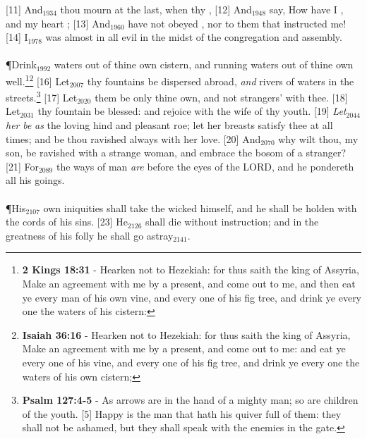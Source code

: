 [11] \textcolor[cmyk]{0.99998,1,0,0}{And\textcolor{jungle}{$_{1934}$} thou mourn at the last, when thy ,}
[12] \textcolor[cmyk]{0.99998,1,0,0}{And\textcolor{jungle}{$_{1948}$} say, How have I , and my heart ;}
[13] \textcolor[cmyk]{0.99998,1,0,0}{And\textcolor{jungle}{$_{1960}$} have not obeyed , nor  to them that instructed me!}
[14] \textcolor[cmyk]{0.99998,1,0,0}{I\textcolor{jungle}{$_{1978}$} was almost in all evil in the midst of the congregation and assembly.}\\
\\
\P \textcolor[cmyk]{0.99998,1,0,0}{Drink\textcolor{jungle}{$_{1992}$} waters out of thine own cistern, and running waters out of thine own well.}\footnote{\textbf{2 Kings 18:31} - Hearken not to Hezekiah: for thus saith the king of Assyria, Make an agreement with me by a present, and come out to me, and then eat ye every man of his own vine, and every one of his fig tree, and drink ye every one the waters of his cistern:}\footnote{\textbf{Isaiah 36:16} - Hearken not to Hezekiah: for thus saith the king of Assyria, Make an agreement with me by a present, and come out to me: and eat ye every one of his vine, and every one of his fig tree, and drink ye every one the waters of his own cistern;}
[16] \textcolor[cmyk]{0.99998,1,0,0}{Let\textcolor{jungle}{$_{2007}$} thy fountains be dispersed abroad, \emph{and} rivers of waters in the streets.}\footnote{\textbf{Psalm 127:4-5} - As arrows are in the hand of a mighty man; so are children of the youth. [5] Happy is the man that hath his quiver full of them: they shall not be ashamed, but they shall speak with the enemies in the gate.}
[17] \textcolor[cmyk]{0.99998,1,0,0}{Let\textcolor{jungle}{$_{2020}$} them be only thine own, and not strangers' with thee.}
[18] \textcolor[cmyk]{0.99998,1,0,0}{Let\textcolor{jungle}{$_{2031}$} thy fountain be blessed: and rejoice with the wife of thy youth.}
[19] \textcolor[cmyk]{0.99998,1,0,0}{\emph{Let}\textcolor{jungle}{$_{2044}$} \emph{her} \emph{be} \emph{as} the loving hind and pleasant roe; let her breasts satisfy thee at all times; and be thou ravished always with her love.}
[20] \textcolor[cmyk]{0.99998,1,0,0}{And\textcolor{jungle}{$_{2070}$} why wilt thou, my son, be ravished with a strange woman, and embrace the bosom of a stranger?}
[21] \textcolor[cmyk]{0.99998,1,0,0}{For\textcolor{jungle}{$_{2089}$} the ways of man \emph{are} before the eyes of the LORD, and he pondereth all his goings.}\\
\\
\P \textcolor[cmyk]{0.99998,1,0,0}{His\textcolor{jungle}{$_{2107}$} own iniquities shall take the wicked himself, and he shall be holden with the cords of his sins.}
[23] \textcolor[cmyk]{0.99998,1,0,0}{He\textcolor{jungle}{$_{2126}$} shall die without instruction; and in the greatness of his folly he shall go astray\textcolor{jungle}{$_{2141}$}.}




